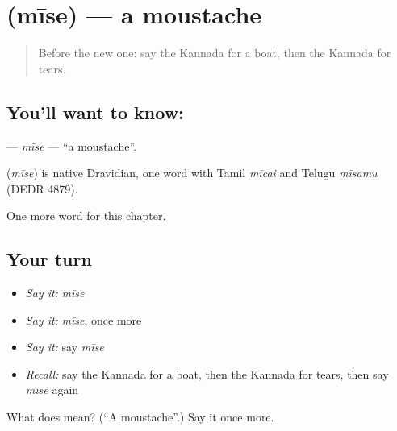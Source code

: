 \section[\texorpdfstring{\kn{ಮೀಸೆ} (mīse)}{ಮೀಸೆ (mīse)}]{ (mīse) — a moustache}

\label{lesson:KA-C139-mise}



\begin{quote}
Before the new one: say the Kannada for a boat, then the Kannada for tears.
\end{quote}

\subsection*{You'll want to know: }
\textbf{} — \emph{mīse} — \textquotedblleft{}a moustache\textquotedblright{}.

\begin{cousinweb}
\textbf{} (\emph{mīse}) is native Dravidian, one word with Tamil \emph{mīcai} and Telugu \emph{mīsamu} (DEDR 4879).
\end{cousinweb}

\begin{grammarlens}[title={What you've built}]
One more word for this chapter.
\end{grammarlens}

\subsection*{Your turn}
\begin{itemize}
\raggedright
  \item \emph{Say it:} \emph{mīse}
  \item \emph{Say it:} \emph{mīse}, once more
  \item \emph{Say it:} say \emph{mīse}
  \item \emph{Recall:} say the Kannada for a boat, then the Kannada for tears, then say \emph{mīse} again
\end{itemize}

\begin{tcolorbox}[breakable,colback=teal!4,colframe=teal!35!black,title={Before you move on}]
What does  mean? (\textquotedblleft{}A moustache\textquotedblright{}.) Say it once more.
\end{tcolorbox}
